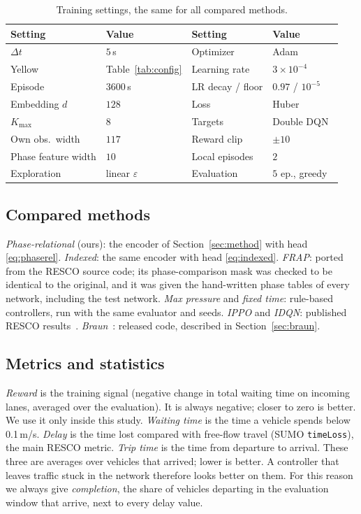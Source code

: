 \documentclass[conference]{IEEEtran}
\begin{document}
\begin{table}[ht]
\caption{Training settings, the same for all compared methods.}
\label{tab:hyper}
\centering\footnotesize
\begin{tabular}{@{}ll@{\hskip 10pt}ll@{}}
\toprule
Setting & Value & Setting & Value \\
\midrule
$\Delta t$ & $5$\,s & Optimizer & Adam \\
Yellow & Table~\ref{tab:config} & Learning rate & $3\!\times\!10^{-4}$ \\
Episode & $3600$\,s & LR decay / floor & $0.97$ / $10^{-5}$ \\
Embedding $d$ & $128$ & Loss & Huber \\
$K_{\max}$ & $8$ & Targets & Double DQN~\cite{ddqn} \\
Own obs.\ width & $117$ & Reward clip & $\pm10$ \\
Phase feature width & $10$ & Local episodes & $2$ \\
Exploration & linear $\varepsilon$ & Evaluation & $5$ ep., greedy \\
\bottomrule
\end{tabular}
\end{table}

\subsection{Compared methods}
\emph{Phase-relational} (ours): the encoder of Section~\ref{sec:method} with head
\eqref{eq:phaserel}. \emph{Indexed}: the same encoder with head \eqref{eq:indexed}.
\emph{FRAP}: ported from the RESCO source code; its phase-comparison mask was checked to be
identical to the original, and it was given the hand-written phase tables of every
network, including the test network. \emph{Max pressure} and \emph{fixed time}: rule-based
controllers, run with the same evaluator and seeds. \emph{IPPO} and \emph{IDQN}: published
RESCO results~\cite{resco}. \emph{Braun}~\cite{graphiface}: released code, described in
Section~\ref{sec:braun}.

\subsection{Metrics and statistics}
\emph{Reward} is the training signal (negative change in total waiting time on incoming
lanes, averaged over the evaluation). It is always negative; closer to zero is better. We
use it only inside this study. \emph{Waiting time} is the time a vehicle spends below
0.1\,m/s. \emph{Delay} is the time lost compared with free-flow travel (SUMO
\texttt{timeLoss}), the main RESCO metric. \emph{Trip time} is the time from departure to
arrival. These three are averages over vehicles that arrived; lower is better. A
controller that leaves traffic stuck in the network therefore looks better on them. For
this reason we always give \emph{completion}, the share of vehicles departing in the
evaluation window that arrive, next to every delay value.
\end{document}

